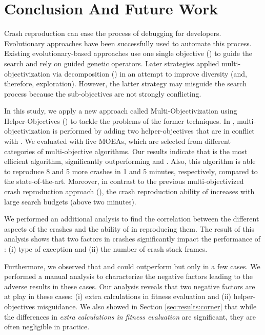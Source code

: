 
\section{Conclusion And Future Work} 

Crash reproduction can ease the process of debugging for developers. Evolutionary approaches have been successfully used to automate this process.
Existing evolutionary-based approaches use one single objective (\ie \CrashFunction) to guide the search and rely on guided genetic operators. 
Later strategies applied multi-objectivization via decomposition (\decomposition) in an attempt to improve diversity (and, therefore, exploration). However, the latter strategy may misguide the search process because the sub-objectives are not strongly conflicting.

In this study, we apply a new approach called Multi-Objectivizati\-on using Helper-Objectives (\moho) to tackle the problems of the former techniques. In \moho, multi-objectivization is performed by adding two helper-objectives that are in conflict with \CrashFunction. We evaluated \moho with five MOEAs, which are selected from different categories of multi-objective algorithms. Our results indicate that \moho is the most efficient algorithm, significantly outperforming \SGGA and \decomposition. Also, this algorithm is able to reproduce 8 and 5 more crashes in 1 and 5 minutes, respectively, compared to the state-of-the-art. Moreover, in contrast to the previous multi-objectivized crash reproduction approach (\decomposition), the crash reproduction ability of \moho increases with large search budgets (\ie above two minutes).

We performed an additional analysis to find the correlation between the different aspects of the crashes and the ability of \moho in reproducing them. The result of this analysis shows that two factors in crashes significantly impact the performance of \moho: (i) type of exception and (ii) the number of crash stack frames.

Furthermore, we observed that \SGGA and \decomposition could outperform \moho but only in a few cases. We performed a manual analysis to characterize the negative factors leading to the adverse results in these cases. Our analysis reveals that two negative factors are at play in these cases: (i) extra calculations in fitness evaluation and (ii) helper-objectives misguidance. We also showed in Section \ref{sec:results:corner} that while the differences in \textit{extra calculations in fitness evaluation} are significant, they are often negligible in practice.

